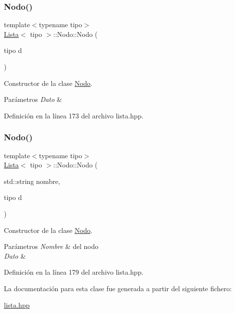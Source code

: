 \subsubsection{\texorpdfstring{Nodo()}{Nodo()}\hspace{0.1cm}{\footnotesize\ttfamily [1/2]}}
{\footnotesize\ttfamily template$<$typename tipo$>$ \\
\hyperlink{classLista}{Lista}$<$ tipo $>$\+::Nodo\+::\+Nodo (\begin{DoxyParamCaption}\item[{tipo}]{d }\end{DoxyParamCaption})\hspace{0.3cm}{\ttfamily [inline]}}



Constructor de la clase \hyperlink{classLista_1_1Nodo}{Nodo}. 


\begin{DoxyParams}{Parámetros}
{\em Dato} & \\
\hline
\end{DoxyParams}


Definición en la línea 173 del archivo lista.\+hpp.

\mbox{\label{classLista_1_1Nodo_a0ab9f1e824afe00a532fabf20ffc2607}} 
\subsubsection{\texorpdfstring{Nodo()}{Nodo()}\hspace{0.1cm}{\footnotesize\ttfamily [2/2]}}
{\footnotesize\ttfamily template$<$typename tipo$>$ \\
\hyperlink{classLista}{Lista}$<$ tipo $>$\+::Nodo\+::\+Nodo (\begin{DoxyParamCaption}\item[{std\+::string}]{nombre,  }\item[{tipo}]{d }\end{DoxyParamCaption})\hspace{0.3cm}{\ttfamily [inline]}}



Constructor de la clase \hyperlink{classLista_1_1Nodo}{Nodo}. 


\begin{DoxyParams}{Parámetros}
{\em Nombre} & del nodo \\
\hline
{\em Dato} & \\
\hline
\end{DoxyParams}


Definición en la línea 179 del archivo lista.\+hpp.



La documentación para esta clase fue generada a partir del siguiente fichero\+:\begin{DoxyCompactItemize}
\item 
\hyperlink{lista_8hpp}{lista.\+hpp}\end{DoxyCompactItemize}
